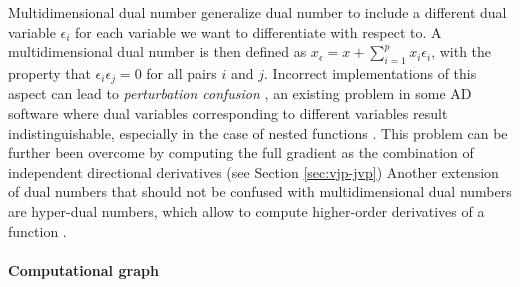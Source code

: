 Multidimensional dual number generalize dual number to include a different dual variable $\epsilon_i$ for each variable we want to differentiate with respect to\cite{Neuenhofen_2018, RevelsLubinPapamarkou2016}.
A multidimensional dual number is then defined as $x_\epsilon = x + \sum_{i=1}^p x_i \epsilon_i$, with the property that $\epsilon_i \epsilon_j = 0$ for all pairs $i$ and $j$.
Incorrect implementations of this aspect can lead to \textit{perturbation confusion} \cite{siskind2005perturbation, manzyuk2019perturbation}, an existing problem in some AD software where dual variables corresponding to different variables result indistinguishable, especially in the case of nested functions \cite{manzyuk2019perturbation}. 
This problem can be further been overcome by computing the full gradient as the combination of independent directional derivatives (see Section \ref{sec:vjp-jvp}) 
Another extension of dual numbers that should not be confused with multidimensional dual numbers are hyper-dual numbers, which allow to compute higher-order derivatives of a function \cite{fike2013multi}. 

\paragraph{Computational graph}

